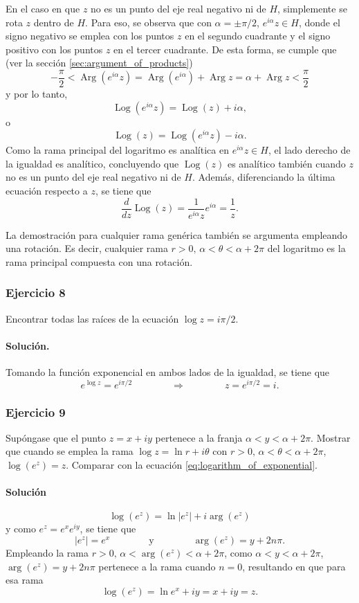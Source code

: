 \documentclass[a4paper]{report}
\DeclareMathOperator{\Arg}{Arg}
\DeclareMathOperator{\Log}{Log}
\begin{document}
En el caso en que \(z\) no es un punto del eje real negativo ni de \(H\), simplemente se rota \(z\) dentro de \(H\). Para eso, se observa que con \(\alpha=\pm\pi/2\), \(e^{i\alpha}z\in H\), donde el signo negativo se emplea con los puntos \(z\) en el segundo cuadrante y el signo positivo con los puntos \(z\) en el tercer cuadrante. De esta forma, se cumple que (ver la sección \ref{sec:argument_of_products}) 
\[
 -\frac{\pi}{2}<\Arg(e^{i\alpha}z)=\Arg(e^{i\alpha})+\Arg z=\alpha+\Arg z<\frac{\pi}{2}
\]
y por lo tanto,
\[
 \Log(e^{i\alpha}z)=\Log(z)+i\alpha,
\]
o
\[
 \Log(z)=\Log(e^{i\alpha}z)-i\alpha.
\]
Como la rama principal del logaritmo es analítica en  \(e^{i\alpha}z\in H\), el lado derecho de la igualdad es analítico, concluyendo que \(\Log(z)\) es analítico también cuando \(z\) no es un punto del eje real negativo ni de \(H\). Además, diferenciando la última ecuación respecto a \(z\), se tiene que  
\[
 \frac{d}{dz}\Log(z)=\frac{1}{e^{i\alpha}z}e^{i\alpha}=\frac{1}{z}.
\]

La demostración para cualquier rama genérica también se argumenta empleando una rotación. Es decir, cualquier rama \(r>0,\,\alpha<\theta<\alpha+2\pi\) del logaritmo es la rama principal compuesta con una rotación.

\subsubsection{Ejercicio 8}

Encontrar todas las raíces de la ecuación \(\log z=i\pi/2\).

\paragraph{Solución.} Tomando la función exponencial en ambos lados de la igualdad, se tiene que 
\[
 e^{\log z}=e^{i\pi/2}
 \qquad\qquad\Rightarrow\qquad\qquad
 z=e^{i\pi/2}=i.
\]

\subsubsection{Ejercicio 9}

Supóngase que el punto \(z=x+iy\) pertenece a la franja \(\alpha<y<\alpha+2\pi\). Mostrar que cuando se emplea la rama \(\log z=\ln r+i\theta\) con \(r>0,\,\alpha<\theta<\alpha+2\pi\), \(\log(e^z)=z\). Comparar con la ecuación \ref{eq:logarithm_of_exponential}.

\paragraph{Solución}
\[
 \log(e^z)=\ln|e^z|+i\arg(e^z)
\]
y como \(e^z=e^xe^{iy}\), se tiene que
\[
 |e^z|=e^x
 \qquad\qquad\textrm{y}\qquad\qquad
 \arg(e^z)=y+2n\pi.
\]
Empleando la rama \(r>0,\,\alpha<\arg(e^z)<\alpha+2\pi\), como \(\alpha<y<\alpha+2\pi\), \(\arg(e^z)=y+2n\pi\) pertenece a la rama cuando \(n=0\), resultando en que para esa rama
\[
 \log(e^z)=\ln e^x+iy=x+iy=z.
\]
\end{document}
